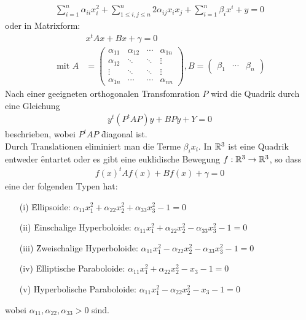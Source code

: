\begin{align}
\sum_{i=1}^{n} \alpha_{ii} x_i^2 + \sum_{1 \leq i, j \leq n}^{n} 2 \alpha_{ij} x_i x_j + \sum_{i=1}^{n} \beta_i x^i + y = 0
\end{align}
oder in Matrixform:
\begin{align}
&x^t A x + Bx + \gamma = 0 \\ 
\text{ mit } A &= \begin{pmatrix} \alpha_{11} & \alpha_{12} & \cdots & \alpha_{1n} \\ \alpha_{12} & \ddots & \ddots & \vdots \\ \vdots & \ddots & \ddots & \vdots \\ \alpha_{1n} & \cdots & \cdots & \alpha_{nn}\end{pmatrix}, B = \begin{pmatrix} \beta_1 & \cdots & \beta_n \end{pmatrix}
\end{align}
Nach einer geeigneten orthogonalen Transfomration $P$ wird die Quadrik durch eine Gleichung 
\begin{align}
y^t (P^t A P) y + B Py + Y = 0
\end{align}
beschrieben, wobei $P^t A P$ \f{diagonal} ist. \\
Durch Translationen eliminiert man die Terme $\beta_i x_i$.
In $\mathbb{R}^3$ ist eine Quadrik entweder \f{entartet} oder es gibt eine euklidische Bewegung $f: \mathbb{R}^3 \rightarrow \mathbb{R}^3$, so dass
\begin{align}
f(x)^t A f(x) + B f(x) + \gamma = 0
\end{align}
eine der folgenden Typen hat:
\begin{itemize}
\item[(i)] \f{Ellipsoide}: $\alpha_{11} x_1^2 + \alpha_{22} x_2^2 + \alpha_{33} x_3^2 -1 = 0$
\item[(ii)] \f{Einschalige Hyperboloide}: $\alpha_{11} x_1^2 + \alpha_{22} x_2^2 - \alpha_{33} x_3^2 -1 = 0$
\item[(iii)] \f{Zweischalige Hyperboloide}: $\alpha_{11} x_1^2 - \alpha_{22} x_2^2 - \alpha_{33} x_3^2 -1 = 0$
\item[(iv)] \f{Elliptische Paraboloide}: $\alpha_{11} x_1^2 + \alpha_{22} x_2^2 - x_3 -1 = 0$
\item[(v)] \f{Hyperbolische Paraboloide}: $\alpha_{11} x_1^2 - \alpha_{22} x_2^2 - x_3 -1 = 0$
\end{itemize}
wobei $\alpha_{11}, \alpha_{22}, \alpha_{33} > 0$ sind.

